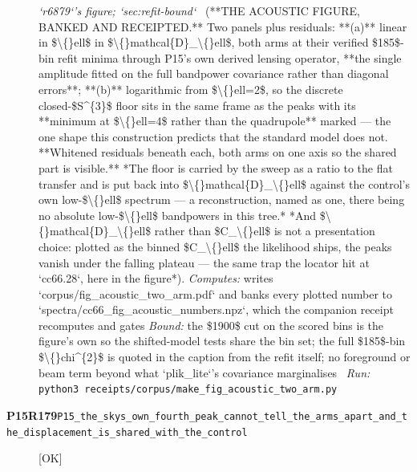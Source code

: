 \begin{description}
\textit{`r6879`'s figure; `sec:refit-bound`} \ (**THE ACOUSTIC FIGURE, BANKED AND RECEIPTED.** Two panels plus residuals: **(a)** linear in \$\textbackslash\{\}ell\$ in \$\textbackslash\{\}mathcal\{D\}\_\textbackslash\{\}ell\$, both arms at their verified \$185\$-bin refit minima through P15's own derived lensing operator, **the single amplitude fitted on the full bandpower covariance rather than diagonal errors**; **(b)** logarithmic from \$\textbackslash\{\}ell=2\$, so the discrete closed-\$S\textasciicircum{}\{3\}\$ floor sits in the same frame as the peaks with its **minimum at \$\textbackslash\{\}ell=4\$ rather than the quadrupole** marked --- the one shape this construction predicts that the standard model does not. **Whitened residuals beneath each, both arms on one axis so the shared part is visible.**  *The floor is carried by the sweep as a ratio to the flat transfer and is put back into \$\textbackslash\{\}mathcal\{D\}\_\textbackslash\{\}ell\$ against the control's own low-\$\textbackslash\{\}ell\$ spectrum --- a reconstruction, named as one, there being no absolute low-\$\textbackslash\{\}ell\$ bandpowers in this tree.*  *And \$\textbackslash\{\}mathcal\{D\}\_\textbackslash\{\}ell\$ rather than \$C\_\textbackslash\{\}ell\$ is not a presentation choice: plotted as the binned \$C\_\textbackslash\{\}ell\$ the likelihood ships, the peaks vanish under the falling plateau --- the same trap the locator hit at `cc66.28`, here in the figure*). 
\emph{Computes:} writes `corpus/fig\_acoustic\_two\_arm.pdf` and banks every plotted number to `spectra/cc66\_fig\_acoustic\_numbers.npz`, which the companion receipt recomputes and gates
 \emph{Bound:}  the \$1900\$ cut on the scored bins is the figure's own so the shifted-model tests share the bin set; the full \$185\$-bin \$\textbackslash\{\}chi\textasciicircum{}\{2\}\$ is quoted in the caption from the refit itself; no foreground or beam term beyond what `plik\_lite`'s covariance marginalises
\ \emph{Run:} \texttt{python3 receipts/corpus/make\_fig\_acoustic\_two\_arm.py}
\item[\rcptlabel{P15_the_skys_own_fourth_peak_cannot_tell_the_arms_apart_and_the_displacement_is_shared_with_the_control}{P15R179}\textbf{P15R179}\quad\texttt{P15\_the\_skys\_own\_fourth\_peak\_cannot\_tell\_the\_arms\_apart\_and\_the\_displacement\_is\_shared\_with\_the\_control}]\hfill\textsf{[OK]}\\

\end{description}
